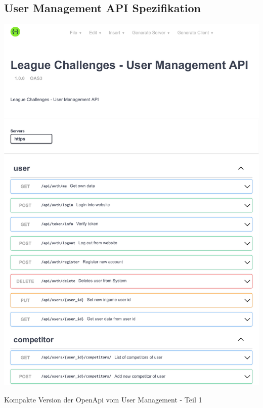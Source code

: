 \subsection{User Management API Spezifikation}
\begin{center}
  \includegraphics[width=1\textwidth, page=1]{images/pdfs/openapi-short.pdf}
  \caption{Kompakte Version der OpenApi vom User Management - Teil 1}
  \label{fig:compact_user_openapi_1}
\end{center}
